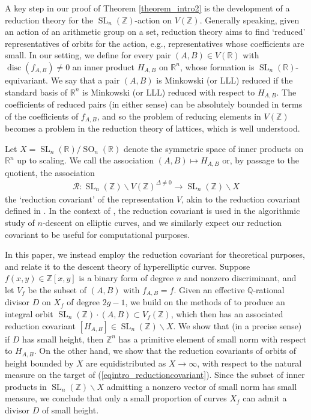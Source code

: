\documentclass{article} %
\numberwithin{equation}{section}
\DeclareMathOperator{\SL}{SL}
\DeclareMathOperator{\SO}{SO}
\newcommand{\R}{\mathbb{R}}
\newcommand{\Q}{\mathbb{Q}}
\newcommand{\Z}{\mathbb{Z}}
\DeclareMathOperator{\disc}{disc}
\begin{document}
A key step in our proof of Theorem \ref{theorem_intro2} is the development of a reduction theory for the $\SL_n(\Z)$-action on $V(\Z)$.
Generally speaking, given an action of an arithmetic group on a set, reduction theory aims to find `reduced' representatives of orbits for the action, e.g., representatives whose coefficients are small.
In our setting, we define for every pair $(A,B)\in V(\R)$ with $\disc(f_{A,B})\neq 0$ an inner product $H_{A,B}$ on $\R^n$, whose formation is $\SL_n(\R)$-equivariant.
We say that a pair $(A,B)$ is Minkowski (or LLL) reduced if the standard basis of $\R^n$ is Minkowski (or LLL) reduced with respect to $H_{A,B}$.
The coefficients of reduced pairs (in either sense) can be absolutely bounded in terms of the coefficients of $f_{A,B}$, and so the problem of reducing elements in $V(\Z)$ becomes a problem in the reduction theory of lattices, which is well understood.

Let $X = \SL_n(\R)/\SO_n(\R)$ denote the symmetric space of inner products on $\R^n$ up to scaling. 
We call the association $(A,B)\mapsto H_{A,B}$ or, by passage to the quotient, the association
\begin{align}\label{eqintro_reductioncovariant}
    \mathcal{R}\colon \SL_n(\Z) \backslash V(\Z)^{\Delta \neq 0} \rightarrow \SL_n(\Z)\backslash X
\end{align}
the `reduction covariant' of the representation $V$, akin to the reduction covariant defined in \cite{CremonaFisherStoll-minimisationreductioncoveringselliptic, StollCremona-reductionbinaryforms, Thorne-reduction}.
In the context of \cite{CremonaFisherStoll-minimisationreductioncoveringselliptic}, the reduction covariant is used in the algorithmic study of $n$-descent on elliptic curves, and we similarly expect our reduction covariant to be useful for computational purposes.

In this paper, we instead employ the reduction covariant for theoretical purposes, and relate it to the descent theory of hyperelliptic curves.
Suppose $f(x,y)\in \Z[x,y]$ is a binary form of degree $n$ and nonzero discriminant, and let $V_f$ be the subset of $(A,B)$ with $f_{A,B} = f$.
Given an effective $\Q$-rational divisor $D$ on $X_f$ of degree $2g-1$, we build on the methods of \cite{BGW17} to produce an integral orbit $\SL_n(\Z)\cdot (A,B) \subset V_f(\Z)$, which then has an associated reduction covariant $[H_{A, B}] \in \SL_n(\Z) \backslash X$. 
We show that (in a precise sense) if $D$ has small height, then $\Z^n$ has a primitive element of small norm with respect to $H_{A,B}$.
On the other hand, we show that the reduction covariants of orbits of height bounded by $X$  are equidistributed as $X \to \infty$, with respect to the natural measure on the target of (\ref{eqintro_reductioncovariant}). 
Since the subset of inner products in $\SL_n(\Z)\backslash X$ admitting a nonzero vector of small norm has small measure, we conclude that only a small proportion of curves $X_f$ can admit a divisor $D$ of small height.
\end{document}
